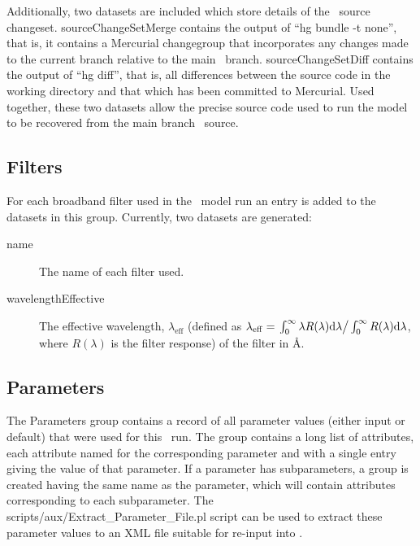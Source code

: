 Additionally, two datasets are included which store details of the \glc\ source changeset. {\normalfont \ttfamily sourceChangeSetMerge} contains the output of ``{\normalfont \ttfamily hg bundle -t none}'', that is, it contains a Mercurial changegroup that incorporates any changes made to the current branch relative to the main \glc\ branch. {\normalfont \ttfamily sourceChangeSetDiff} contains the output of ``{\normalfont \ttfamily hg diff}'', that is, all differences between the source code in the working directory and that which has been committed to Mercurial. Used together, these two datasets allow the precise source code used to run the model to be recovered from the main branch \glc\ source.

\subsection{Filters}

For each broadband filter used in the \glc\ model run an entry is added to the datasets in this group. Currently, two datasets are generated:
\begin{description}
\item[{\normalfont \ttfamily name}] The name of each filter used.
\item[{\normalfont \ttfamily wavelengthEffective}] The effective wavelength, $\lambda_\mathrm{eff}$ (defined as $\lambda_\mathrm{eff}=\left. \int_0^\infty \lambda R(\lambda) \mathrm{d}\lambda \right/ \int_0^\infty R(\lambda) \mathrm{d}\lambda$, where $R(\lambda)$ is the filter response) of the filter in \AA.
\end{description}

\subsection{Parameters}

The {\normalfont \ttfamily Parameters} group contains a record of all parameter values (either input or default) that were used for this \glc\ run. The group contains a long list of attributes, each attribute named for the corresponding parameter and with a single entry giving the value of that parameter. If a parameter has subparameters, a group is created having the same name as the parameter, which will contain attributes corresponding to each subparameter. The {\normalfont \ttfamily scripts/aux/Extract\_Parameter\_File.pl} script can be used to extract these parameter values to an XML file suitable for re-input into \glc.

